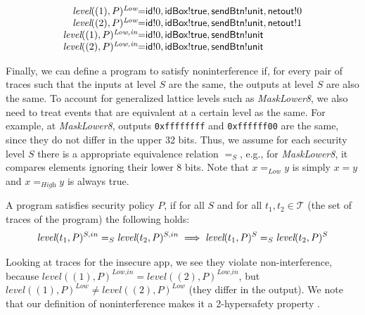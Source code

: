 \documentclass{llncs}
\newcommand{\code}[1]{\textsf{#1}} %
\newcommand{\bcode}[1]{\texttt{#1}}
\newcommand{\tr}{t\xspace}
\newcommand{\tset}{\ensuremath{\mathcal{T}}\xspace}
\newcommand{\tleveltr}[2]{\textit{level}(#1, #2)}
\begin{document}
\begin{displaymath}
  \begin{array}{r@{ }c@{ }l}
    \tleveltr{(1)}{P}^\textit{Low} & = & \code{id}!0, \code{idBox}!\code{true},
    \code{sendBtn}!\code{unit}, \code{netout}!0 \\
    \tleveltr{(2)}{P}^\textit{Low} & = & \code{id}!0, \code{idBox}!\code{true},
    \code{sendBtn}!\code{unit}, \code{netout}!1 \\
    \tleveltr{(1)}{P}^\textit{Low,in} & = & \code{id}!0, \code{idBox}!\code{true},
    \code{sendBtn}!\code{unit} \\
    \tleveltr{(2)}{P}^\textit{Low,in} & = & \code{id}!0, \code{idBox}!\code{true},
    \code{sendBtn}!\code{unit} \\
  \end{array}
\end{displaymath}

Finally, we can define a program to satisfy noninterference if, for
every pair of traces such that the inputs at level $S$ are the same,
the outputs at level $S$ are also the same.
%
To account for generalized lattice levels such as \textit{MaskLower8},
we also need to treat events that are equivalent at a certain level as
the same. For example, at \textit{MaskLower8}, outputs
\bcode{0xffffffff} and \bcode{0xffffff00} are the same, since they do
not differ in the upper 32 bits. Thus, we assume for each security
level $S$ there is a appropriate equivalence relation $=_S$, e.g., for
\textit{MaskLower8}, it compares elements ignoring their lower 8
bits. Note that $x =_\textit{Low} y$ is simply $x = y$ and
$x =_\textit{High} y$ is always true.

\begin{definition}
  \label{defn:noninterference}
  A program satisfies security policy $P$, if for all $S$ and for
  all $t_1, t_2 \in
      \tset$ (the set of traces of the program) the following holds:
\begin{displaymath}
    \tleveltr{\tr_1}{P}^{S,in} =_S \tleveltr{\tr_2}{P}^{S,in}
    \implies
    \tleveltr{\tr_1}{P}^S =_S \tleveltr{\tr_2}{P}^S \\
\end{displaymath}
\end{definition}

Looking at traces for the insecure app, we see
they violate non-interference, because
$\tleveltr{(1)}{P}^\textit{Low,in} =
\tleveltr{(2)}{P}^\textit{Low,in}$, but
$\tleveltr{(1)}{P}^\textit{Low} \neq \tleveltr{(2)}{P}^\textit{Low}$
(they differ in the output).  We note that our definition of
noninterference makes it a 2-hypersafety property \cite{Clarkson:10}.
\end{document}
